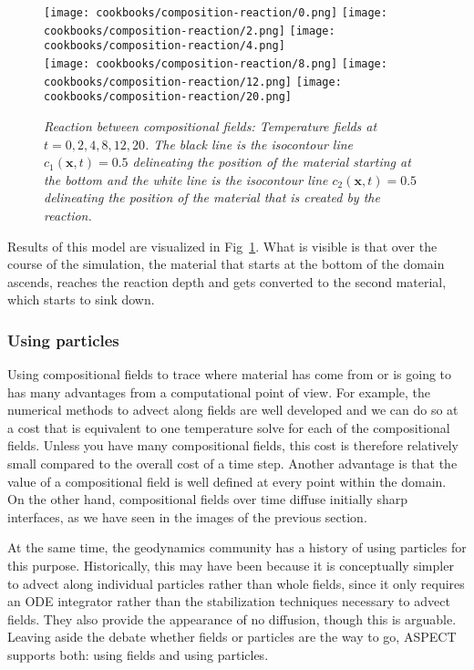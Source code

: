 \documentclass{article}
\newcommand{\aspect}{\textsc{ASPECT}}
\begin{document}
\begin{figure}
  \centering
  \texttt{[image: cookbooks/composition-reaction/0.png]}
  \hfill
  \texttt{[image: cookbooks/composition-reaction/2.png]}
  \hfill
  \texttt{[image: cookbooks/composition-reaction/4.png]}
  \\[6pt]
  \texttt{[image: cookbooks/composition-reaction/8.png]}
  \hfill
  \texttt{[image: cookbooks/composition-reaction/12.png]}
  \hfill
  \texttt{[image: cookbooks/composition-reaction/20.png]}
  \caption{\it Reaction between compositional fields: Temperature fields at $t=0, 2, 4, 8,
  12, 20$. The black line is the isocontour line $c_1(\mathbf x,t)=0.5$
    delineating the position of the material starting at the bottom and the white line is the    isocontour line $c_2(\mathbf x,t)=0.5$
    delineating the position of the material that is created by the reaction.}
  \label{fig:composition-reaction}
\end{figure}

Results of this model are visualized in
Fig~\ref{fig:composition-reaction}. What is visible is
that over the course of the simulation, the material that starts at the bottom
of the domain ascends, reaches the reaction depth and gets converted to the second material, which starts to sink down.



\subsubsection{Using particles}
\label{sec:cookbooks-particles}

Using compositional fields to trace where material has come from or is going to
has many advantages from a computational point of view. For example, the
numerical methods to advect along fields are well developed and we can do so at
a cost that is equivalent to one temperature solve for each of the compositional
fields. Unless you have many compositional fields, this cost is therefore
relatively small compared to the overall cost of a time step. Another advantage
is that the value of a compositional field is well defined at every point within
the domain. On the other hand, compositional fields over time diffuse initially
sharp interfaces, as we have seen in the images of the previous section.

At the same time, the geodynamics community has a history of using particles for
this purpose. Historically, this may have been because it is conceptually
simpler to advect along individual particles rather than whole fields, since it
only requires an ODE integrator rather than the stabilization techniques
necessary to advect fields. They also provide the appearance of no diffusion,
though this is arguable. Leaving aside the debate whether fields or particles are the
way to go, \aspect{} supports both: using fields and using particles.
\end{document}
